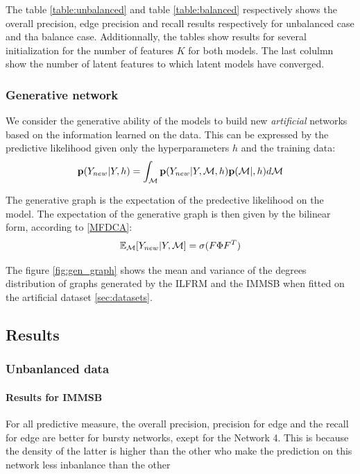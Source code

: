 The table \ref{table:unbalanced} and table \ref{table:balanced} respectively shows the overall precision, edge precision and recall results respectively for unbalanced case and tha balance case. Additionnally, the tables show results for several initialization for the number of features $K$ for both models. The last colulmn show the number of latent features to which latent models have converged.

\subsubsection{Generative network}
We consider the generative ability of the models to build new \emph{artificial} networks based on the information learned on the data. This can be expressed by the predictive likelihood given only the hyperparameters $h$ and the training data:
\begin{equation}
    \mathbf{p}(Y_{new} |Y, h) = \int_{\mathcal{M}} \mathbf{p}(Y_{new} |Y,\mathcal{M}, h)\mathbf{p}(\mathcal{M} |, h)d\mathcal{M}
\end{equation}

The generative graph is the expectation of the predective likelihood on the model. The expectation of the generative graph is then given by the bilinear form, according to \ref{MFDCA}:
\begin{equation}
    \mathbb{E}_{\mathcal{M}}[Y_{new} | Y, \mathcal{M}] = \sigma(F \Phi F^T)
\end{equation}


The figure \ref{fig:gen_graph} shows the mean and variance of the degrees distribution of graphs generated by the ILFRM and the IMMSB when fitted on the artificial dataset \ref{sec:datasets}.


\subsection{Results}

\subsubsection{Unbanlanced data}

\paragraph{Results for IMMSB}

For all predictive measure, the overall precision, precision for edge and the recall for edge are better for bursty networks, exept for the Network 4. This is because the density of the latter is higher than the other who make the prediction on this network less inbanlance than the other

